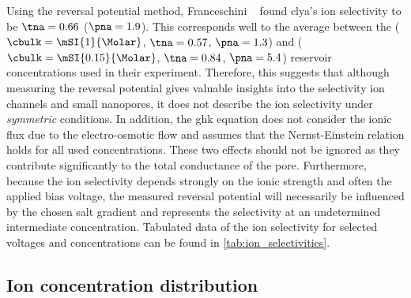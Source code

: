 Using the reversal potential method, Franceschini \etal{}~\cite{Franceschini-2016} found \gls{clya}'s ion
selectivity to be $\tna=0.66$ ($\pna=1.9$). This corresponds well to the average between the \cisi{}
($\cbulk=\mSI{1}{\Molar}$, $\tna=0.57$, $\pna=1.3$) and \transi{} ($\cbulk=\mSI{0.15}{\Molar}$, $\tna=0.84$,
$\pna=5.4$) reservoir concentrations used in their experiment. Therefore, this suggests that although
measuring the reversal potential gives valuable insights into the selectivity ion channels and small
nanopores, it does not describe the ion selectivity under \emph{symmetric} conditions. In addition, the
\gls{ghk} equation does not consider the ionic flux due to the electro-osmotic flow and assumes that the
Nernst-Einstein relation holds for all used concentrations. These two effects should not be ignored as they
contribute significantly to the total conductance of the pore. Furthermore, because the ion selectivity
depends strongly on the ionic strength and often the applied bias voltage, the measured reversal potential
will necessarily be influenced by the chosen salt gradient and represents the selectivity at an undetermined
intermediate concentration. Tabulated data of the ion selectivity for selected voltages and concentrations can
be found in \cref{tab:ion_selectivities}.


\subsection{Ion concentration distribution}\label{sec:ionc}
%

